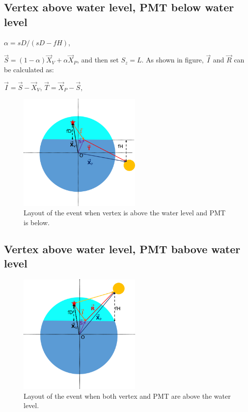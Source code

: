 \documentclass[preprint,12pt]{elsarticle}
\begin{document}
\subsection{Vertex above water level, PMT below water level}

$\alpha = sD/(sD-fH)$, 

$\vec{S} = (1-\alpha)\vec{X}_V+\alpha\vec{X}_P$, and then set $S_z = L$. As shown in figure, 
$\vec{I}$ and $\vec{R}$ can be calculated as:

$\vec{I} = \vec{S}-\vec{X}_V$, $\vec{T} = \vec{X}_P-\vec{S}$, 



\begin{figure}[htbp]
	\centering	
	\includegraphics[width=6cm]{geo_VtPb.png}
	\caption{\label{VtPb} 
		Layout of the event when vertex is above the water level and PMT is below.
	}
\end{figure}

\subsection{Vertex above water level, PMT babove water level}




\begin{figure}[htbp]
	\centering	
	\includegraphics[width=6cm]{geo_VtPt.png}
	\caption{\label{VtPt} 
		Layout of the event when both vertex and PMT are above the water level.
	}
\end{figure}
\end{document}
